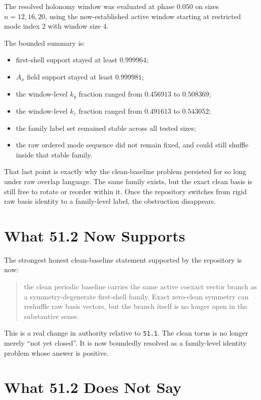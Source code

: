 \documentclass[11pt]{article}
\begin{document}
The resolved holonomy window was evaluated at phase \(0.050\) on sizes \(n = 12, 16, 20\), using the now-established active window starting at restricted mode index \(2\) with window size \(4\).

The bounded summary is:
\begin{itemize}
\item first-shell support stayed at least \(0.999964\);
\item \(A_x\) field support stayed at least \(0.999981\);
\item the window-level \(k_y\) fraction ranged from \(0.456913\) to \(0.508369\);
\item the window-level \(k_z\) fraction ranged from \(0.491613\) to \(0.543052\);
\item the family label set remained stable across all tested sizes;
\item the raw ordered mode sequence did not remain fixed, and could still shuffle inside that stable family.
\end{itemize}

That last point is exactly why the clean-baseline problem persisted for so long under raw overlap language. The same family exists, but the exact clean basis is still free to rotate or reorder within it. Once the repository switches from rigid raw basis identity to a family-level label, the obstruction disappears.

\section{What 51.2 Now Supports}

The strongest honest clean-baseline statement supported by the repository is now:

\begin{quote}
the clean periodic baseline carries the same active coexact vector branch as a symmetry-degenerate first-shell family. Exact zero-clean symmetry can reshuffle raw basis vectors, but the branch itself is no longer open in the substantive sense.
\end{quote}

This is a real change in authority relative to \texttt{51.1}. The clean torus is no longer merely ``not yet closed''. It is now boundedly resolved as a family-level identity problem whose answer is positive.

\section{What 51.2 Does Not Say}
\end{document}

